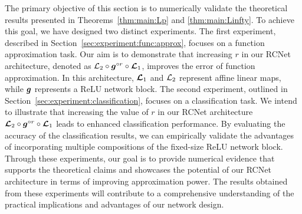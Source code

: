 \documentclass[nohyperref]{article}
\theoremstyle{plain}
\theoremstyle{definition}
\theoremstyle{remark}
\begin{document}

The primary objective of this section is to numerically validate the theoretical results presented in Theorems~\ref{thm:main:Lp} and \ref{thm:main:Linfty}. To achieve this goal, we have designed two distinct experiments.
The first experiment, described in Section~\ref{sec:experiment:func:approx}, focuses on a function approximation task. Our aim is to demonstrate that increasing $r$ in our RCNet architecture, denoted as ${\mathcal{L}}_2\circ {\bm{g}}^{\circ r}\circ {\bm{\mathcal{L}}}_1$, improves the error of function approximation. In this architecture, ${\bm{\mathcal{L}}}_1$ and ${\mathcal{L}}_2$ represent affine linear maps, while ${\bm{g}}$ represents a ReLU network block.
The second experiment, outlined in Section~\ref{sec:experiment:classification}, focuses on a classification task. We intend to illustrate that increasing the value of $r$ in our RCNet architecture 
${\bm{\mathcal{L}}}_2\circ {\bm{g}}^{\circ r}\circ {\bm{\mathcal{L}}}_1$
leads to enhanced classification performance. By evaluating the accuracy of the classification results, we can empirically validate the advantages of incorporating multiple compositions of the fixed-size ReLU network block.
Through these experiments, our goal is to provide numerical evidence that supports the theoretical claims and showcases the potential of our RCNet architecture in terms of improving approximation power. The results obtained from these experiments will contribute to a comprehensive understanding of the practical implications and advantages of our network design.
\end{document}
